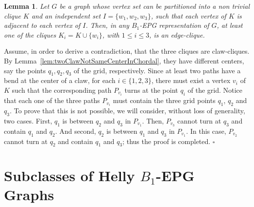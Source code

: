 \documentclass[9pt]{entcs}
\newtheorem{lema}{Lemma}[section]
\newtheorem{defi}{Definition}[section]
\begin{document}



\begin{lema}\label{lem:3cliquesNotClaw}
Let $G$ be a graph whose vertex set  can be
partitioned into a non trivial clique $K$ and an independent set $I=\{w_1,w_2,w_3\}$, such that each vertex of $K$ is adjacent to each vertex of $I$. Then, in any $B_1$-EPG representation of $G$, at least one of the cliques  $K_i = K \cup \{w_i\}$, with $1 \leq i \leq 3$,  is an edge-clique. 
\end{lema}

\begin{pf}
Assume, in order to derive a contradiction, that the three cliques are claw-cliques. By Lemma~\ref{lem:twoClawNotSameCenterInChordal}, they have different centers, say the points $q_1, q_2, q_3$ of the grid, respectively. Since at least two paths have a bend at the center of a claw, for each $i\in\{1,2,3\}$,   there must exist a vertex
  $v_i$ of $K$ such that the corresponding path $P_{v_i}$ turns at the point $q_i$ of the grid.  Notice that each one of the three paths $P_{v_i}$
  must contain  the three grid points $q_1$, $q_2$ and $q_3$. To prove that this is not possible, we will consider, without loss of generality, two cases.
  First,  $q_1$ is between $q_2$ and $q_3$ in $P_{v_1}$. Then, $P_{v_3}$ cannot turn at $q_3$ and contain $q_1$ and $q_2$.   And second,
  $q_2$ is between $q_1$ and $q_3$ in $P_{v_1}$. In this case, $P_{v_2}$ cannot turn at $q_2$ and contain $q_1$ and $q_3$; thus the proof is completed.
 $\square$
\end{pf}





\section{Subclasses of Helly $B_1$-EPG Graphs}
\end{document}
